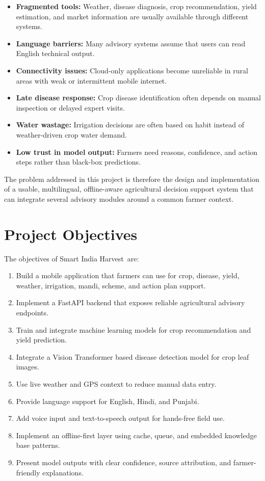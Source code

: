 \documentclass[12pt,a4paper]{report}
\newcommand{\ProjectName}{Smart India Harvest}
\begin{document}
\begin{itemize}[leftmargin=1.5em]
  \item \textbf{Fragmented tools:} Weather, disease diagnosis, crop recommendation, yield estimation, and market information are usually available through different systems.
  \item \textbf{Language barriers:} Many advisory systems assume that users can read English technical output.
  \item \textbf{Connectivity issues:} Cloud-only applications become unreliable in rural areas with weak or intermittent mobile internet.
  \item \textbf{Late disease response:} Crop disease identification often depends on manual inspection or delayed expert visits.
  \item \textbf{Water wastage:} Irrigation decisions are often based on habit instead of weather-driven crop water demand.
  \item \textbf{Low trust in model output:} Farmers need reasons, confidence, and action steps rather than black-box predictions.
\end{itemize}

The problem addressed in this project is therefore the design and implementation of a usable, multilingual, offline-aware agricultural decision support system that can integrate several advisory modules around a common farmer context.

\section{Project Objectives}

The objectives of \ProjectName\ are:

\begin{enumerate}[leftmargin=1.5em]
  \item Build a mobile application that farmers can use for crop, disease, yield, weather, irrigation, mandi, scheme, and action plan support.
  \item Implement a FastAPI backend that exposes reliable agricultural advisory endpoints.
  \item Train and integrate machine learning models for crop recommendation and yield prediction.
  \item Integrate a Vision Transformer based disease detection model for crop leaf images.
  \item Use live weather and GPS context to reduce manual data entry.
  \item Provide language support for English, Hindi, and Punjabi.
  \item Add voice input and text-to-speech output for hands-free field use.
  \item Implement an offline-first layer using cache, queue, and embedded knowledge base patterns.
  \item Present model outputs with clear confidence, source attribution, and farmer-friendly explanations.
\end{enumerate}
\end{document}
